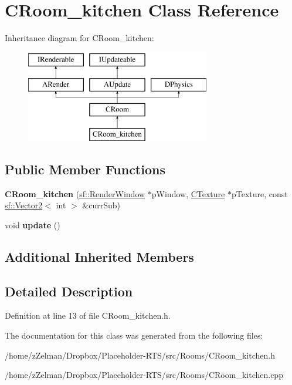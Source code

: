 \hypertarget{classCRoom__kitchen}{\section{C\-Room\-\_\-kitchen Class Reference}
\label{classCRoom__kitchen}
}
Inheritance diagram for C\-Room\-\_\-kitchen\-:\begin{figure}[H]
\begin{center}
\leavevmode
\includegraphics[height=4.000000cm]{classCRoom__kitchen}
\end{center}
\end{figure}
\subsection*{Public Member Functions}
\begin{DoxyCompactItemize}
\item 
\hypertarget{classCRoom__kitchen_a5bb2e465e287208513ecc4e30caf1977}{{\bfseries C\-Room\-\_\-kitchen} (\hyperlink{classsf_1_1RenderWindow}{sf\-::\-Render\-Window} $\ast$p\-Window, \hyperlink{classCTexture}{C\-Texture} $\ast$p\-Texture, const \hyperlink{classsf_1_1Vector2}{sf\-::\-Vector2}$<$ int $>$ \&curr\-Sub)}\label{classCRoom__kitchen_a5bb2e465e287208513ecc4e30caf1977}

\item 
\hypertarget{classCRoom__kitchen_a6c3ad2d5a04a0b1ed566e6d1108a923c}{void {\bfseries update} ()}\label{classCRoom__kitchen_a6c3ad2d5a04a0b1ed566e6d1108a923c}

\end{DoxyCompactItemize}
\subsection*{Additional Inherited Members}


\subsection{Detailed Description}


Definition at line 13 of file C\-Room\-\_\-kitchen.\-h.



The documentation for this class was generated from the following files\-:\begin{DoxyCompactItemize}
\item 
/home/z\-Zelman/\-Dropbox/\-Placeholder-\/\-R\-T\-S/src/\-Rooms/C\-Room\-\_\-kitchen.\-h\item 
/home/z\-Zelman/\-Dropbox/\-Placeholder-\/\-R\-T\-S/src/\-Rooms/C\-Room\-\_\-kitchen.\-cpp\end{DoxyCompactItemize}
